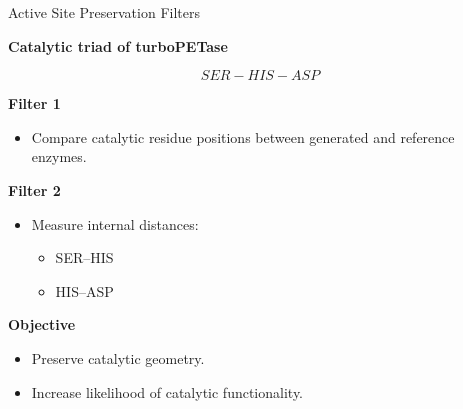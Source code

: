 \documentclass[aspectratio=169]{beamer}
\begin{document}
	\begin{frame}{Active Site Preservation Filters}
		
		\textbf{Catalytic triad of turboPETase}
		
		\[
		SER - HIS - ASP
		\]
		
		\vspace{0.5cm}
		
		\textbf{Filter 1}
		
		\begin{itemize}
			\item Compare catalytic residue positions between generated and reference enzymes.
		\end{itemize}
		
		\vspace{0.3cm}
		
		\textbf{Filter 2}
		
		\begin{itemize}
			\item Measure internal distances:
			\begin{itemize}
				\item SER--HIS
				\item HIS--ASP
			\end{itemize}
		\end{itemize}
		
		\vspace{0.3cm}
		
		\textbf{Objective}
		
		\begin{itemize}
			\item Preserve catalytic geometry.
			\item Increase likelihood of catalytic functionality.
		\end{itemize}
		
	\end{frame}
	
\end{document}
